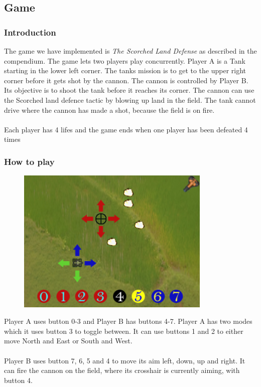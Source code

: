 \subsection{Game}

\subsubsection{Introduction}
The game we have implemented is {\it The Scorched Land Defense} as described in the compendium. The game lets
two players play concurrently. Player A is a Tank starting in the lower left corner. The tanks
mission is to get to the upper right corner before it gets shot by the cannon. The cannon is
controlled by Player B. Its objective is to shoot the tank before it reaches its corner. The cannon
can use the Scorched land defence tactic by blowing up land in the field. The tank cannot drive
where the cannon has made a shot, because the field is on fire.\\
\\
Each player has 4 lifes and the game ends when one player has been defeated 4 times

\subsubsection{How to play}
\begin{figure}[h]
  \includegraphics[width=350px]{graphics/buttons_illustration.jpg}

\end{figure}
Player A uses button 0-3 and Player B has buttons 4-7. Player A has two modes which it uses button 3
to toggle between. It can use buttons 1 and 2 to either move North and East or South and West.\\
\\
Player B uses button 7, 6, 5 and 4 to move its aim left, down, up and right. It can fire the cannon on
the field, where its crosshair is currently aiming, with button 4.

